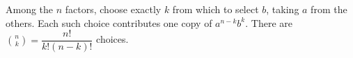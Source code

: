 Among the $n$ factors, choose exactly $k$ from which to select $b$, taking $a$ from the others. Each such choice contributes one copy of $a^{n-k}b^k$. There are $\binom nk=\dfrac{n!}{k!(n-k)!}$ choices.
